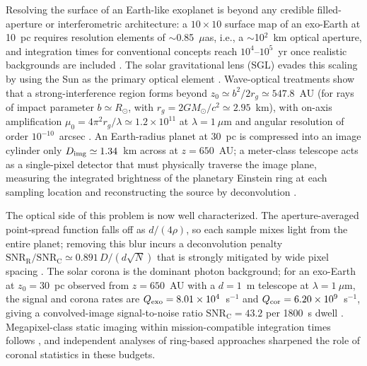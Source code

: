 \documentclass[twocolumn,10pt]{article}
\begin{document}
Resolving the surface of an Earth-like exoplanet is beyond any credible
filled-aperture or interferometric architecture: a $10\times10$ surface
map of an exo-Earth at 10~pc requires resolution elements of
$\sim$0.85~$\mu$as, i.e., a $\sim$10$^2$~km optical aperture, and
integration times for conventional concepts reach $10^4$--$10^5$~yr once
realistic backgrounds are included \citep{tur26direct}. The solar
gravitational lens (SGL) evades this scaling by using the Sun as the
primary optical element \citep{eshleman79,tt17}. Wave-optical treatments
show that a strong-interference region forms beyond
$z_0\simeq b^2/2r_g\simeq547.8$~AU (for rays of impact parameter
$b\simeq R_\odot$, with $r_g=2GM_\odot/c^2\simeq2.95$~km), with on-axis
amplification $\mu_0=4\pi^2 r_g/\lambda\simeq1.2\times10^{11}$ at
$\lambda=1~\mu$m and angular resolution of order $10^{-10}$~arcsec
\citep{tt17,tt19}. An Earth-radius planet at 30~pc is compressed into an
image cylinder only $D_{\rm img}\simeq1.34$~km across at $z=650$~AU; a
meter-class telescope acts as a single-pixel detector that must
physically traverse the image plane, measuring the integrated brightness
of the planetary Einstein ring at each sampling location and
reconstructing the source by deconvolution
\citep{tt20psf,toth21,tt22mnras}.

The optical side of this problem is now well characterized. The
aperture-averaged point-spread function falls off as $d/(4\rho)$, so each
sample mixes light from the entire planet; removing this blur incurs a
deconvolution penalty $\mathrm{SNR_R/SNR_C}\simeq0.891\,D/(d\sqrt{N})$
that is strongly mitigated by wide pixel spacing \citep{toth21,tt22mnras}.
The solar corona is the dominant photon background; for an exo-Earth at
$z_0=30$~pc observed from $z=650$~AU with a $d=1$~m telescope at
$\lambda=1~\mu$m, the signal and corona rates are
$Q_{\rm exo}=8.01\times10^4$~s$^{-1}$ and
$Q_{\rm cor}=6.20\times10^9$~s$^{-1}$, giving a convolved-image
signal-to-noise ratio $\mathrm{SNR_C}=43.2$ per 1800~s dwell
\citep{tt22mnras,tur26bench}. Megapixel-class static imaging within
mission-compatible integration times follows \citep{toth21,tt22mnras},
and independent analyses of ring-based approaches
\citep{mm22} sharpened the role of coronal statistics in these budgets.
\end{document}
